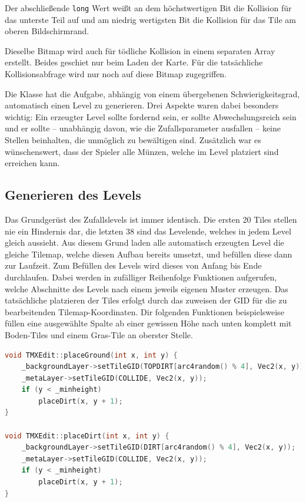 Der abschließende \texttt{long} Wert weißt an dem höchstwertigen Bit die Kollision für das unterste Teil auf und am niedrig wertigsten Bit die Kollision für das Tile am oberen Bildschirmrand.

Dieselbe Bitmap wird auch für tödliche Kollision in einem separaten Array erstellt. Beides geschiet nur beim Laden der Karte. Für die tatsächliche Kollisionsabfrage wird nur noch auf diese Bitmap zugegriffen.


\label{sec:4_Automatisch erzeugte Tilemapst}

Die   Klasse hat die Aufgabe, abhängig von einem übergebenen Schwierigkeitsgrad, automatisch einen Level zu generieren. Drei Aspekte waren dabei besonders wichtig: Ein erzeugter Level sollte fordernd sein, er sollte Abwechslungsreich sein und er sollte – unabhängig davon, wie die Zufallsparameter ausfallen – keine Stellen beinhalten, die unmöglich zu bewältigen sind. Zusätzlich war es wünschenswert, dass der Spieler alle Münzen, welche im Level platziert sind erreichen kann.


\subsection{Generieren des Levels}
Das Grundgerüst des Zufallslevels ist immer identisch. Die ersten 20 Tiles stellen nie ein Hindernis dar, die letzten 38 sind das Levelende, welches in jedem Level gleich aussieht. Aus diesem Grund laden alle automatisch erzeugten Level die gleiche Tilemap, welche diesen Aufbau bereits umsetzt, und befüllen diese dann zur Laufzeit.
Zum Befüllen des Levels wird dieses von Anfang bis Ende durchlaufen.  Dabei werden in zufälliger Reihenfolge Funktionen aufgerufen, welche Abschnitte des Levels nach einem jeweils eigenen Muster erzeugen. Das tatsächliche platzieren der Tiles erfolgt durch das zuweisen der GID für die zu bearbeitenden Tilemap-Koordinaten. 
Dir folgenden Funktionen beispielsweise füllen eine ausgewählte Spalte ab einer gewissen Höhe
nach unten komplett mit Boden-Tiles und einem Gras-Tile an oberster Stelle.

\begin{lstlisting}[label=lst:place_ground,
				   language=C++,
				   firstnumber=127,
				   caption=Platzieren von Boden-Tiles ( TMXEdit.cpp )]
void TMXEdit::placeGround(int x, int y) {
	_backgroundLayer->setTileGID(TOPDIRT[arc4random() % 4], Vec2(x, y));
	_metaLayer->setTileGID(COLLIDE, Vec2(x, y));
	if (y < _minheight)
		placeDirt(x, y + 1);
}

void TMXEdit::placeDirt(int x, int y) {
	_backgroundLayer->setTileGID(DIRT[arc4random() % 4], Vec2(x, y));
	_metaLayer->setTileGID(COLLIDE, Vec2(x, y));
	if (y < _minheight)
		placeDirt(x, y + 1);
}
\end{lstlisting}


